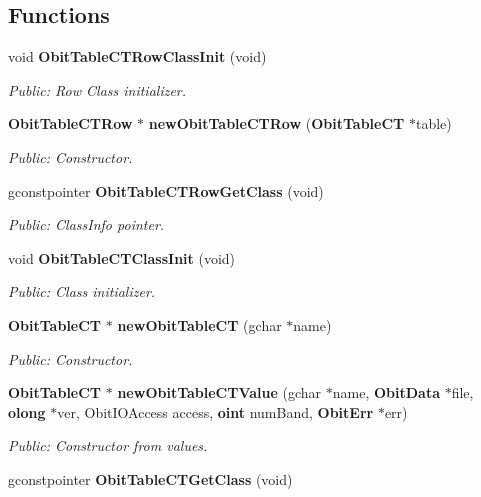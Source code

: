 \subsection*{Functions}
\begin{CompactItemize}
\item 
void {\bf Obit\-Table\-CTRow\-Class\-Init} (void)
\begin{CompactList}\small\item\em Public: Row Class initializer. \item\end{CompactList}\item 
{\bf Obit\-Table\-CTRow} $\ast$ {\bf new\-Obit\-Table\-CTRow} ({\bf Obit\-Table\-CT} $\ast$table)
\begin{CompactList}\small\item\em Public: Constructor. \item\end{CompactList}\item 
gconstpointer {\bf Obit\-Table\-CTRow\-Get\-Class} (void)
\begin{CompactList}\small\item\em Public: Class\-Info pointer. \item\end{CompactList}\item 
void {\bf Obit\-Table\-CTClass\-Init} (void)
\begin{CompactList}\small\item\em Public: Class initializer. \item\end{CompactList}\item 
{\bf Obit\-Table\-CT} $\ast$ {\bf new\-Obit\-Table\-CT} (gchar $\ast$name)
\begin{CompactList}\small\item\em Public: Constructor. \item\end{CompactList}\item 
{\bf Obit\-Table\-CT} $\ast$ {\bf new\-Obit\-Table\-CTValue} (gchar $\ast$name, {\bf Obit\-Data} $\ast$file, {\bf olong} $\ast$ver, Obit\-IOAccess access, {\bf oint} num\-Band, {\bf Obit\-Err} $\ast$err)
\begin{CompactList}\small\item\em Public: Constructor from values. \item\end{CompactList}\item 
gconstpointer {\bf Obit\-Table\-CTGet\-Class} (void)

\end{CompactItemize}
